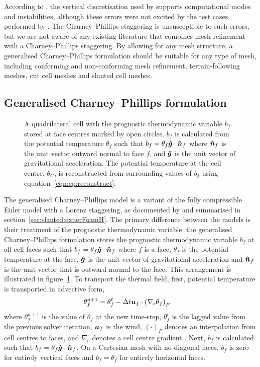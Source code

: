 According to \citet{thuburn-woolings2005}, the vertical discretisation used by \citet{yamazaki-satomura2012} supports computational modes and instabilities, although these errors were not excited by the test cases performed by \citet{yamazaki-satomura2012}.
The Charney--Phillips staggering is unsusceptible to such errors, but we are not aware of any existing literature that combines mesh refinement with a Charney--Phillips staggering.
By allowing for any mesh structure, a generalised Charney--Phillips formulation should be suitable for any type of mesh, including conforming and non-conforming mesh refinement, terrain-following meshes, cut cell meshes and slanted cell meshes.

\subsection{Generalised Charney--Phillips formulation}

\begin{figure}
	\centering
	
	\caption{A quadrilateral cell with the prognostic thermodynamic variable $b_f$ stored at face centres marked by open circles.
	$b_f$ is calculated from the potential temperature $\theta_f$ such that $b_f = \theta_f \bm{\hat{g}} \cdot \bm{\hat{n}}_f$ where $\bm{\hat{n}}_f$ is the unit vector outward normal to face $f$, and $\bm{\hat{g}}$ is the unit vector of gravitational acceleration.
	The potential temperature at the cell centre, $\theta_C$, is reconstructed from surrounding values of $b_f$ using equation~\eqref{eqn:cp:reconstruct}.}
	\label{fig:cp:staggering}
\end{figure}

The generalised Charney--Phillips model is a variant of the fully compressible Euler model with a Lorenz staggering, as documented by \citet{weller-shahrokhi2014} and summarised in section~\ref{sec:slanted:exnerFoamH}.
The primary difference between the models is their treatment of the prognostic thermodynamic variable: the generalised Charney--Phillips formulation stores the prognostic thermodynamic variable $b_f$ at all cell faces such that $b_f = \theta_f \bm{\hat{g}} \cdot \bm{\hat{n}}_f$ where $f$ is a face, $\theta_f$ is the potential temperature at the face, $\bm{\hat{g}}$ is the unit vector of gravitational acceleration and $\bm{\hat{n}}_f$ is the unit vector that is outward normal to the face.
This arrangement is illustrated in figure~\ref{fig:cp:staggering}.
To transport the thermal field, first, potential temperature is transported in advective form,
\begin{align}
	\theta_f^{n+1} &= \theta_f^{\ell} - \Delta t \bm{u}_f \cdot \left( \nabla_c \theta_f \right)_F
\end{align}
where $\theta_f^{n+1}$ is the value of $\theta_f$ at the new time-step, $\theta_f^\ell$ is the lagged value from the previous solver iteration, $\bm{u}_f$ is the wind, $\left( \cdot \right)_F$ denotes an interpolation from cell centres to faces, and $\nabla_c$ denotes a cell centre gradient \citep{weller-shahrokhi2014}.
Next, $b_f$ is calculated such that $b_f = \theta_f \bm{\hat{g}} \cdot \bm{\hat{n}}_f$.  
On a Cartesian mesh with no diagonal faces, $b_f$ is zero for entirely vertical faces and $b_f = \theta_f$ for entirely horizontal faces.

